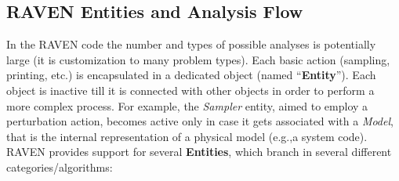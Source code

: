 \subsection{RAVEN Entities and Analysis Flow}
\label{sub:EntitiesAndFlow}
In the RAVEN code the number and types of possible analyses is potentially large (it is customization to many problem types).
Each basic action (sampling, printing, etc.) is encapsulated in
a dedicated object (named ``\textbf{Entity}''). Each object is inactive till it is connected with
other objects in order to perform a more complex process. For example,
the \textit{Sampler} entity, aimed to employ a perturbation action, becomes active only in case
it gets associated with a \textit{Model}, that is the internal representation of a physical model (e.g.,a system code).
\\RAVEN provides support for several \textbf{Entities}, which branch in several different categories/algorithms:
